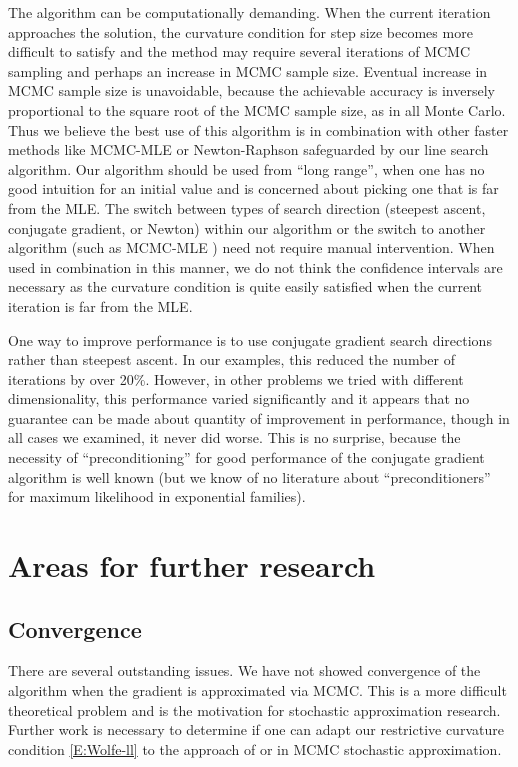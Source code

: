 The algorithm can be computationally demanding.  When the current iteration approaches 
the solution, the 
curvature condition for step size becomes more difficult to satisfy and the method may 
require several iterations of 
MCMC sampling and perhaps an increase in MCMC sample size.  Eventual increase in MCMC 
sample size is unavoidable,
because the achievable accuracy is inversely proportional to the square root of the 
MCMC sample size, as in all Monte Carlo.
Thus we believe the best use of this algorithm is in combination with other faster 
methods like MCMC-MLE \citep{Geyer:1992}
or Newton-Raphson safeguarded by our line search algorithm.  Our 
algorithm should be used from ``long range'', when one has no good intuition for an 
initial value and is concerned about 
picking one that is far from the MLE.  The switch between types of search direction 
(steepest ascent, conjugate gradient,
or Newton) within our algorithm or the switch to another algorithm (such as MCMC-MLE 
\citep{Geyer:1992})
need not require manual intervention.  When used in combination in this
manner, we do not think the confidence intervals are necessary as the curvature 
condition is quite easily satisfied 
when the current iteration is far from the MLE.

One way to improve performance is to use conjugate gradient search directions rather 
than steepest ascent.  In our 
examples, this reduced the number of iterations by over 20\%.  However, in other 
problems we tried with different 
dimensionality, this performance varied significantly and it appears that no guarantee 
can be made about quantity of 
improvement in performance, though in all cases we examined, it never did worse.  This 
is no surprise, because the
necessity of ``preconditioning'' for good performance of the conjugate gradient 
algorithm is well known (but 
we know of no literature about ``preconditioners'' for 
maximum likelihood in exponential families).

\section{Areas for further research}
\subsection{Convergence}
There are several outstanding issues.  We have not showed convergence of 
the algorithm when the gradient 
is approximated via MCMC.  This is a more difficult theoretical problem and is the 
motivation for stochastic 
approximation research.  
Further work is necessary to determine if one can adapt our restrictive curvature 
condition \eqref{E:Wolfe-ll} to the 
approach of \citet{Andrieu:2005} or \citet{Liang:2010} in MCMC stochastic 
approximation.  

